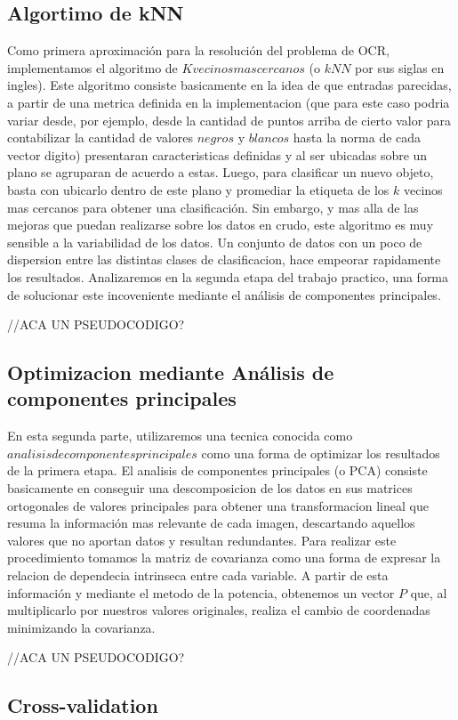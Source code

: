 \subsection{Algortimo de kNN}
Como primera aproximaci\'on para la resoluci\'on del problema de OCR, implementamos el algoritmo de $K vecinos mas cercanos$ (o $kNN$ por sus siglas en ingles). Este algoritmo consiste basicamente en la idea de que entradas parecidas, a partir de una metrica definida en la implementacion (que para este caso podria variar desde, por ejemplo, desde la cantidad de puntos arriba de cierto valor para contabilizar la cantidad de valores $negros$ y $blancos$ hasta la norma de cada vector digito) presentaran caracteristicas definidas y al ser ubicadas sobre un plano se agruparan de acuerdo a estas. Luego, para clasificar un nuevo objeto, basta con ubicarlo dentro de este plano y promediar la etiqueta de los $k$ vecinos mas cercanos para obtener una clasificaci\'on. Sin embargo, y mas alla de las mejoras que puedan realizarse sobre los datos en crudo, este algoritmo es muy sensible a la variabilidad de los datos. Un conjunto de datos con un poco de dispersion entre las distintas clases de clasificacion, hace empeorar rapidamente los resultados.
Analizaremos en la segunda etapa del trabajo practico, una forma de solucionar este incoveniente mediante el an\'alisis de componentes principales.

//ACA UN PSEUDOCODIGO?

\subsection{Optimizacion mediante An\'alisis de componentes principales}
En esta segunda parte, utilizaremos una tecnica conocida como $analisis de componentes principales$ como una forma de optimizar los resultados de la primera etapa. El analisis de componentes principales (o PCA) consiste basicamente en conseguir una descomposicion de los datos en sus matrices ortogonales de valores principales para obtener una transformacion lineal que resuma la informaci\'on mas relevante de cada imagen, descartando aquellos valores que no aportan datos y resultan redundantes.
Para realizar este procedimiento tomamos la matriz de covarianza como una forma de expresar la relacion de dependecia intrinseca entre cada variable. A partir de esta informaci\'on y mediante el metodo de la potencia, obtenemos un vector $P$ que, al multiplicarlo por nuestros valores originales, realiza el cambio de coordenadas minimizando la covarianza.

//ACA UN PSEUDOCODIGO?

\subsection{Cross-validation}
